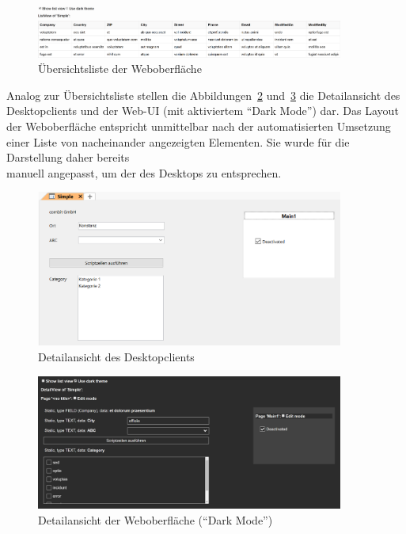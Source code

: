 \begin{figure}[htb]
    \centering
    \captionsetup{justification=centering}
    \includegraphics[width=0.9\textwidth]{figures/listview_new.png}
        \caption{Übersichtsliste der Weboberfläche}\label{fig:listview_new}
\end{figure}

Analog zur Übersichtsliste stellen die Abbildungen~\ref{fig:detailview_crm} und~\ref{fig:detailview_new} die Detailansicht des Desktopclients und der Web-UI (mit aktiviertem \enquote{Dark Mode}) dar. Das Layout der Weboberfläche entspricht unmittelbar nach der automatisierten Umsetzung einer Liste von nacheinander angezeigten Elementen. Sie wurde für die Darstellung daher bereits\\ manuell angepasst, um der des Desktops zu entsprechen.

\begin{figure}[htb]
    \centering
    \captionsetup{justification=centering}
    \includegraphics[width=0.9\textwidth]{figures/detailview_crm.png}
        \caption{Detailansicht des Desktopclients}\label{fig:detailview_crm}
\end{figure}

\begin{figure}[htb]
    \centering
    \captionsetup{justification=centering}
    \includegraphics[width=0.9\textwidth]{figures/detailview_new.png}
        \caption{Detailansicht der Weboberfläche (\enquote{Dark Mode})}\label{fig:detailview_new}
\end{figure}

